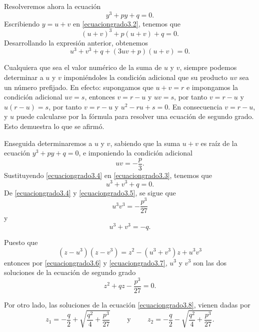 Resolveremos ahora la ecuación
\begin{equation}
    y^3+py+q=0. \label{ecuaciongrado3.2}
\end{equation}
Escribiendo $y=u+v$ en \eqref{ecuaciongrado3.2}, tenemos que
$$(u+v)^3+p(u+v)+q=0.$$
Desarrollando la expresión anterior, obtenemos
\begin{equation}
    u^3+v^3+q+(3uv+p)(u+v)=0. \label{ecuaciongrado3.3}
\end{equation}

Cualquiera que sea el valor numérico de la suma de $u$ y $v$, siempre podemos determinar a $u$ y $v$ imponiéndoles la condición adicional que su producto $uv$ sea un número prefijado. En efecto: supongamos que $u+v=r$ e impongamos la condición adicional $uv=s$, entonces $v=r-u$ y $uv=s$, por tanto $v=r-u$ y $u(r-u)=s$, por tanto $v=r-u$ y $u^2-r u+s=0$. En consecuencia $v=r-u$, y $u$ puede calcularse por la fórmula para resolver una ecuación de segundo grado. Esto demuestra lo que se afirmó.

Enseguida determinaremos a $u$ y $v$, sabiendo que la suma $u+v$ es raíz de la ecuación $y^3+p y+q=0$, e imponiendo la condición adicional
\begin{equation}
    uv=-\frac{p}{3}. \label{ecuaciongrado3.4}
\end{equation}
Sustituyendo \eqref{ecuaciongrado3.4} en \eqref{ecuaciongrado3.3}, tenemos que
\begin{equation}
    u^3+v^3+q=0. \label{ecuaciongrado3.5}
\end{equation}
De \eqref{ecuaciongrado3.4} y \eqref{ecuaciongrado3.5}, se sigue que
\begin{equation}
    u^3v^3=-\frac{p^3}{27} \label{ecuaciongrado3.6}
\end{equation}
y
\begin{equation}
    u^3+v^3=-q. \label{ecuaciongrado3.7}
\end{equation}

Puesto que
$$\left(z-u^3\right)\left(z-v^3\right)=z^2-\left(u^3+v^3\right)z+u^3v^3$$
entonces por \eqref{ecuaciongrado3.6} y \eqref{ecuaciongrado3.7}, $u^3$ y $v^3$ son las dos soluciones de la ecuación de segundo grado
\begin{equation}
    z^2+qz-\frac{p^3}{27}=0. \label{ecuaciongrado3.8}
\end{equation}

Por otro lado, las soluciones de la ecuación \eqref{ecuaciongrado3.8}, vienen dadas por
$$z_1=-\frac{q}{2}+\sqrt{\frac{q^2}{4}+\frac{p^3}{27}} \hspace{1cm} \text{y} \hspace{1cm} z_2=-\frac{q}{2}-\sqrt{\frac{q^2}{4}+\frac{p^3}{27}}.$$

